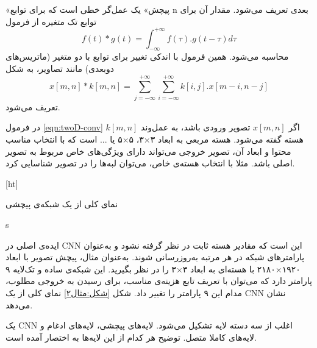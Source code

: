 



«پیچش» یک عمل‌گر خطی است که برای توابع n بعدی تعریف ‌می‌شود. مقدار آن برای توابع تک متغیره از فرمول 
\begin{equation}\label{eqn:conv}
	f(t) * g(t) = \int_{-\infty}^{+\infty}f(\tau).g(t - \tau)d\tau
\end{equation} 
محاسبه می‌شود.\cite{oppenheim} همین فرمول با اندکی تغییر برای توابع با دو متغیر (ماتریس‌های دوبعدی) مانند تصاویر، به شکل 
\begin{equation}\label{eqn:twoD-conv}
	x[m, n] * k[m, n] = \sum_{j=-\infty}^{+\infty}\sum_{i=-\infty}^{+\infty}k[i, j].x[m - i, n - j]
\end{equation} 
تعریف می‌شود.\cite{2d_conv_src}

در فرمول \ref{eqn:twoD-conv} اگر $x[m, n]$ تصویر ورودی باشد، به عمل‌وند $k[m, n]$  هسته  گفته می‌شود. هسته مربعی به ابعاد ۳×۳، ۵×۵ یا ... است که با انتخاب مناسب محتوا و ابعاد آن، تصویر خروجی می‌تواند دارای ویژگی‌های خاص مربوط به تصویر اصلی باشد. مثلا با انتخاب هسته‌ی خاص، می‌توان لبه‌ها را در تصویر شناسایی کرد. 


[ht]
\caption[نمای کلی از یک شبکه‌ی پیچشی]{{\footnotesize نمای کلی از یک شبکه‌ی پیچشی  \cite{CNN_structure}}}

s

ایده‌ی اصلی در CNN این‌ است که مقادیر هسته‌ ثابت در نظر گرفته نشود و به‌عنوان پارامترهای شبکه‌ در هر مرتبه به‌روزرسانی شوند.\cite{goodfellow} به‌عنوان مثال، پیچش تصویر با ابعاد ۱۹۲۰×۲۱۸۰ با هسته‌ای به ابعاد ۳×۳ را در نظر بگیرید. این شبکه‌ی ساده و تک‌لایه ۹ پارامتر دارد که می‌توان با تعریف تابع هزینه‌ی مناسب، برای رسیدن به خروجی مطلوب، مدام این ۹ پارامتر را تغییر داد. شکل \ref{شکل:مثال۲} نمای کلی از یک CNN نشان می‌دهد. 

یک CNN اغلب از سه دسته لایه تشکیل می‌شود. لایه‌های پیچشی، لایه‌های ادغام و لایه‌های کاملا متصل. توضیح هر کدام از این لایه‌ها به اختصار آمده‌ است.


